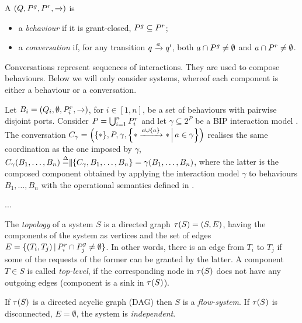 \begin{definition}
  \label{defn:components}
  A \compmodel{} $(Q, \pin, \pout, \goesto{})$ is
  \begin{itemize}
  \item a \emph{behaviour} if it is grant-closed, \ie $\pin \subseteq
    \pout$;
  \item a \emph{conversation} if, for any transition $q \goesto{a} q'$, both
    $a \cap \pin \neq \emptyset$ and $a \cap \pout \neq \emptyset$.
  \end{itemize}
\end{definition}

Conversations represent sequences of interactions. They are used to compose
behaviours. Below we will
only consider systems, whereof each component is either a behaviour or a
conversation.

\begin{example}
  \label{ex:bip}
  Let $B_i = (Q_i, \emptyset, \pout_i, \goesto{})$, for $i \in [1,n]$, be a
  set of behaviours with pairwise disjoint ports.  Consider $P =
  \bigcup_{i=1}^n \pout_i$ and let $\gamma \subseteq 2^P$ be a BIP
  interaction model \cite{BliSif07-acp-emsoft}.  The conversation $C_\gamma
  = \Big(\{*\}, P, \gamma, \Setdef{* \goesto{a\cup\{a\}} *}{a \in
    \gamma}\Big)$ realises the same coordination as the one imposed by
  $\gamma$, \ie $C_\gamma(B_1, \dots, B_n) \bydef{=} \compose[\{C_\gamma,
    B_1, \dots, B_n\}] = \gamma(B_1, \dots, B_n)$, where the latter is the
  composed component obtained by applying the interaction model $\gamma$ to
  behaviours $B_1, \dots, B_n$ with the operational semantics defined in
  \cite{BliSif07-acp-emsoft}.
\end{example}

\begin{example}
  \label{ex:network}
  ...
\end{example}

\begin{definition}[Topologies]
  \label{defn:topology}
  The \emph{topology} of a system $S$ is a directed graph $\topo{S} = (S,
  E)$, having the components of the system as vertices and the set of edges
  $E = \setdef{(T_i,T_j)}{\pout_i \cap \pin_j \neq \emptyset}$.  In other
  words, there is an edge from $T_i$ to $T_j$ if some of the requests of
  the former can be granted by the latter.  A component $T \in S$ is called
  \emph{top-level}, if the corresponding node in $\topo{S}$ does not have
  any outgoing edges (\ie component is a sink in $\topo{S}$).

  If $\topo{S}$ is a directed acyclic graph (DAG) then $S$ is a
  \emph{flow-system}.  If $\topo{S}$ is disconnected, \ie $E = \emptyset$,
  the system is \emph{independent}.
\end{definition}

